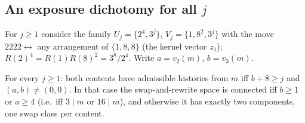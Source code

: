\subsection{An exposure dichotomy for all \texorpdfstring{$j$}{j}}
For $j\ge1$ consider the family $U_j=\{2^4,3^j\}$, $V_j=\{1,8^2,3^j\}$ with the move $2222\leftrightarrow$ any arrangement of $\{1,8,8\}$ (the kernel vector $z_1$); $R(2)^4=R(1)R(8)^2=3^8/2^4$. Write $a=v_2(m)$, $b=v_3(m)$.
\begin{theorem}\label{thm:Fj}
For every $j\ge1$: both contents have admissible histories from $m$ iff $b+8\ge j$ and $(a,b)\ne(0,0)$. In that case the swap-and-rewrite space is connected iff $b\ge1$ or $a\ge4$ (i.e.\ iff $3\mid m$ or $16\mid m$), and otherwise it has exactly two components, one swap class per content.
\end{theorem}
